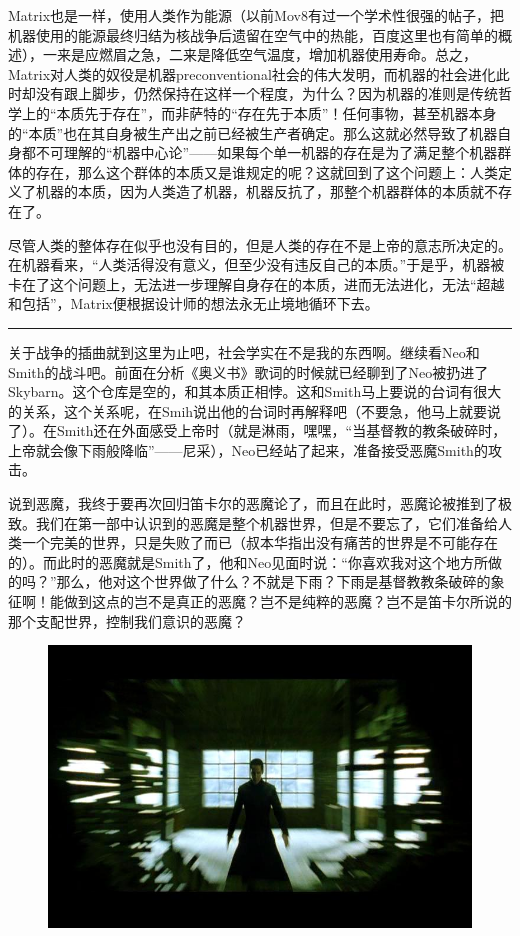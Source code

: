 \documentclass[UTF8]{ctexart}
\newcommand{\myparsep}{\noindent \rule[0.5ex]{\linewidth}{1pt}}
\begin{document}
Matrix也是一样，使用人类作为能源（以前Mov8有过一个学术性很强的帖子，把机器使用的能源最终归结为核战争后遗留在空气中的热能，百度这里也有简单的概述），一来是应燃眉之急，二来是降低空气温度，增加机器使用寿命。总之，Matrix对人类的奴役是机器preconventional社会的伟大发明，而机器的社会进化此时却没有跟上脚步，仍然保持在这样一个程度，为什么？因为机器的准则是传统哲学上的“本质先于存在”，而非萨特的“存在先于本质”！任何事物，甚至机器本身的“本质”也在其自身被生产出之前已经被生产者确定。那么这就必然导致了机器自身都不可理解的“机器中心论”——如果每个单一机器的存在是为了满足整个机器群体的存在，那么这个群体的本质又是谁规定的呢？这就回到了这个问题上：人类定义了机器的本质，因为人类造了机器，机器反抗了，那整个机器群体的本质就不存在了。

尽管人类的整体存在似乎也没有目的，但是人类的存在不是上帝的意志所决定的。在机器看来，“人类活得没有意义，但至少没有违反自己的本质。”于是乎，机器被卡在了这个问题上，无法进一步理解自身存在的本质，进而无法进化，无法“超越和包括”，Matrix便根据设计师的想法永无止境地循环下去。

\myparsep

关于战争的插曲就到这里为止吧，社会学实在不是我的东西啊。继续看Neo和Smith的战斗吧。前面在分析《奥义书》歌词的时候就已经聊到了Neo被扔进了Skybarn。这个仓库是空的，和其本质正相悖。这和Smith马上要说的台词有很大的关系，这个关系呢，在Smih说出他的台词时再解释吧（不要急，他马上就要说了）。在Smith还在外面感受上帝时（就是淋雨，嘿嘿，“当基督教的教条破碎时，上帝就会像下雨般降临”——尼采），Neo已经站了起来，准备接受恶魔Smith的攻击。

说到恶魔，我终于要再次回归笛卡尔的恶魔论了，而且在此时，恶魔论被推到了极致。我们在第一部中认识到的恶魔是整个机器世界，但是不要忘了，它们准备给人类一个完美的世界，只是失败了而已（叔本华指出没有痛苦的世界是不可能存在的）。而此时的恶魔就是Smith了，他和Neo见面时说：“你喜欢我对这个地方所做的吗？”那么，他对这个世界做了什么？不就是下雨？下雨是基督教教条破碎的象征啊！能做到这点的岂不是真正的恶魔？岂不是纯粹的恶魔？岂不是笛卡尔所说的那个支配世界，控制我们意识的恶魔？

\begin{figure}[htb]
\centering
\includegraphics[width=0.5\linewidth]{fig/e87cd31bb8fd89d7ad6e750a.jpg}
\end{figure}
\end{document}
